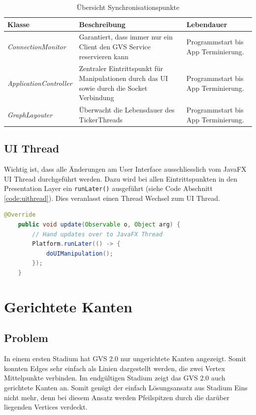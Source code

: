 \documentclass[11pt,a4paper,english,oneside]{book}
\numberwithin{equation}{chapter}
\begin{document}
	\begin{table}[h!]
		\centering
		\begin{tabularx}{\linewidth}{l X X}
			\toprule 
			Klasse & Beschreibung & Lebendauer \\
			\midrule
			\textit{ConnectionMonitor} & Garantiert, dass immer nur ein Client den GVS Service reservieren kann & Programmstart bis App Terminierung. \\
			\textit{ApplicationController} & Zentraler Eintrittspunkt für Manipulationen durch das UI sowie durch die Socket Verbindung & Programmstart bis App Terminierung. \\
			\textit{GraphLayouter} & Überwacht die Lebensdauer des TickerThreads & Programmstart bis App Terminierung. \\
			\bottomrule 
		\end{tabularx} 
		\caption{Übersicht Synchronisationspunkte} 
			\label{tbl:sync-pt}
	\end{table}
	
	\subsection{UI Thread}
	Wichtig ist, dass alle Änderungen am User Interface ausschliesslich vom JavaFX UI Thread durchgeführt werden. Dazu wird bei allen Eintrittspunkten in den Presentation Layer ein \lstinline|runLater()| ausgeführt (siehe Code Abschnitt \ref{code:uithread}). Dies veranlasst einen Thread Wechsel zum UI Thread. 
	
	\clearpage
	
	\begin{lstlisting}[language=java, frame=single, caption={Java FX UI Thread}, label={code:uithread}]
	@Override
	public void update(Observable o, Object arg) {
		// Hand updates over to JavaFX Thread
		Platform.runLater(() -> {
			doUIManipulation();
		});
	}
	\end{lstlisting}
	
	
	
	\section{Gerichtete Kanten}
	\subsection{Problem}
	In einem ersten Stadium hat GVS 2.0 nur ungerichtete Kanten angezeigt. Somit konnten Edges sehr einfach als Linien dargestellt werden, die zwei Vertex Mittelpunkte verbinden. Im endgültigen Stadium zeigt das GVS 2.0 auch gerichtete Kanten an. Somit genügt der einfach Lösungsansatz aus Stadium Eins nicht mehr, denn bei diesem Ansatz werden Pfeilspitzen durch die darüber liegenden Vertices verdeckt.
	
\end{document}
